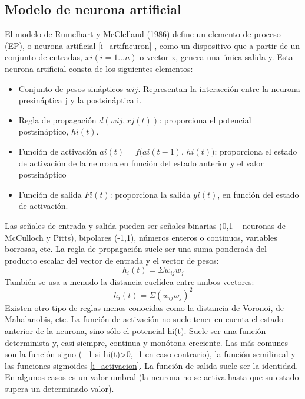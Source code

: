 \documentclass[12pt]{book} %
\begin{document}
		\subsection{Modelo de neurona artificial}
			 El modelo de Rumelhart y McClelland (1986) define un elemento de proceso (EP), o neurona artificial \ref{i_artifneuron} , como un dispositivo
			 que a partir de un conjunto de entradas, $xi (i=1...n)$ o vector x, genera una única salida y.
			 Esta neurona artificial consta de los siguientes elementos:
			 \begin{multicols}{2}
			 \begin{itemize}
			 	\item Conjunto de pesos sinápticos $wij$. Representan la interacción entre la neurona presináptica j y la postsináptica i.
			 	\item Regla de propagación $d(wij,xj(t))$: proporciona el potencial postsináptico, $hi(t)$.
			 	\item Función de activación $ai(t)=f(ai(t-1)$, $hi(t))$: proporciona el estado de activación de la neurona en función del estado anterior y
			 		 el valor postsináptico
			 	\item Función de salida $Fi(t)$: proporciona la salida $yi(t)$, en función del estado de activación.
			 \end{itemize}
			 \end{multicols}
			  Las señales de entrada y salida pueden ser señales binarias (0,1 – neuronas de McCulloch y Pitts), bipolares (-1,1), números enteros o
			  continuos, variables borrosas, etc.
			  La regla de propagación suele ser una suma ponderada del producto escalar del vector de entrada y el vector de pesos: 
			  $$ h_{i}(t) = \Sigma w_{ij}w_{j}$$
			  También se usa a menudo la distancia euclídea entre ambos vectores: 
			  $$ h_{i}(t) = \Sigma (w_{ij}w_{j})^{2}$$
			  Existen otro tipo de reglas menos conocidas como la distancia de Voronoi, de Mahalanobis, etc.
			  La función de activación no suele tener en cuenta el estado anterior de la neurona, sino sólo el potencial hi(t). Suele ser una función
			  determinista y, casi siempre, continua y monótona creciente. Las más comunes son la función signo (+1 si hi(t)>0, -1 en caso contrario), 
			  la función semilineal y las funciones sigmoides \ref{i_activacion}.
			  La función de salida suele ser la identidad. En algunos casos es un valor umbral (la neurona no se activa hasta que su estado supera un
			  determinado valor).
\end{document}

